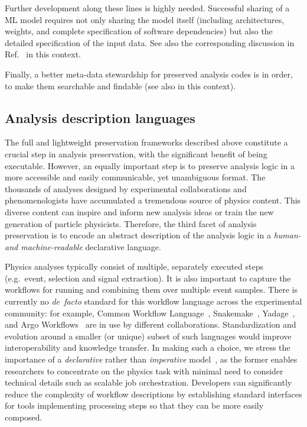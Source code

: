 \documentclass[11pt]{article}
\begin{document}
Further development along these lines is highly needed. Successful sharing of a \gls{ML} model requires not only sharing the model itself (including architectures, weights, and complete specification of software dependencies) but also the detailed specification of the input data. See also the corresponding discussion in Ref.~\cite{snowmass:MLevts} in this context.

Finally, a better meta-data stewardship for preserved analysis codes is in order, to make them searchable and findable (see also  in this context).

\subsection{Analysis description languages}

The full and lightweight preservation frameworks described above constitute a crucial step in analysis preservation, with the significant benefit of being executable.  
However, an equally important step is to preserve %
analysis logic in a more accessible and easily communicable, yet unambiguous format.
The thousands of analyses designed by experimental collaborations and phenomenologists have accumulated a tremendous source of physics content. This diverse content can inspire and inform new analysis ideas or train the new generation of particle physicists. %
Therefore, the third facet of \gls{analysis preservation} is to encode an abstract description of the analysis logic in a \emph{human- and machine-readable} declarative language. 

Physics analyses typically consist of multiple, separately executed steps (e.g.~event, selection and signal extraction). It is also important to capture the workflows for running and combining them over multiple event samples. There is currently no \emph{de~facto} standard for this workflow language across the experimental community: for example, Common Workflow Language~\cite{CWL}, Snakemake~\cite{SnakeMake}, Yadage~\cite{Cranmer:2017frf,yadage_code}, and Argo Workflows~\cite{argo} are in use by different collaborations. Standardization and evolution around a smaller (or unique) subset of such languages would improve interoperability and knowledge transfer. In making such a choice, we stress the importance of a \textsl{declarative} rather than \textsl{imperative} model~\cite{10.3389/fdata.2021.661501}, as the former enables researchers to concentrate on the physics task with minimal need to consider technical details such as scalable job orchestration. Developers can significantly reduce the complexity of workflow descriptions by establishing standard interfaces for tools implementing processing steps so that they can be more easily composed.
\end{document}
